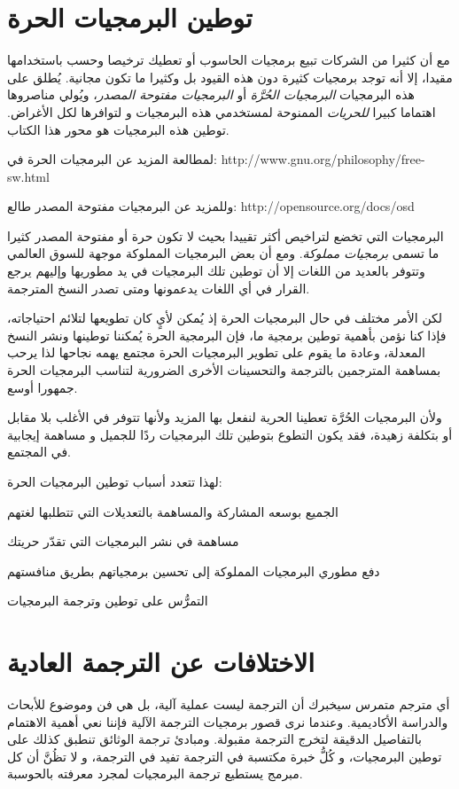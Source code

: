\section{توطين البرمجيات الحرة}
مع أن كثيرا من الشركات تبيع برمجيات الحاسوب أو تعطيك ترخيصا وحسب
باستخدامها مقيدا، إلا أنه توجد برمجيات كثيرة دون هذه القيود بل وكثيرا
ما تكون مجانية. يُطلق على هذه البرمجيات {\it البرمجيات الحُرَّة} أو
{\it البرمجيات مفتوحة المصدر}، ويُولي مناصروها اهتماما كبيرا {\it
للحريات} الممنوحة لمستخدمي هذه البرمجيات و لتوافرها لكل الأغراض. توطين
هذه البرمجيات هو محور هذا الكتاب.

لمطالعة المزيد عن البرمجيات الحرة في:
http://www.gnu.org/philosophy/free-sw.html

وللمزيد عن البرمجيات مفتوحة المصدر طالع: http://opensource.org/docs/osd

البرمجيات التي تخضع لتراخيص أكثر تقييدا بحيث لا تكون حرة أو مفتوحة
المصدر كثيرا ما تسمى {\it برمجيات مملوكة}. ومع أن بعض البرمجيات
المملوكة موجهة للسوق العالمي وتتوفر بالعديد من اللغات إلا أن توطين تلك
البرمجيات في يد مطوريها وإليهم يرجع القرار في أي اللغات يدعمونها ومتى
تصدر النسخ المترجمة.

لكن الأمر مختلف في حال البرمجيات الحرة إذ يُمكن لأيٍ كان تطويعها لتلائم
احتياجاته، فإذا كنا نؤمن بأهمية توطين برمجية ما، فإن البرمجية الحرة
يُمكننا توطينها ونشر النسخ المعدلة، وعادة ما يقوم على تطوير البرمجيات
الحرة مجتمع يهمه نجاحها لذا يرحب بمساهمة المترجمين بالترجمة والتحسينات
الأخرى الضرورية لتناسب البرمجيات الحرة جمهورا أوسع. 

ولأن البرمجيات الحُرَّة تعطينا الحرية لنفعل بها المزيد ولأنها تتوفر في
الأغلب بلا مقابل أو بتكلفة زهيدة، فقد يكون التطوع بتوطين تلك البرمجيات
ردًا للجميل و مساهمة إيجابية في المجتمع.

لهذا تتعدد أسباب توطين البرمجيات الحرة:

\startitemize[1]
\item الجميع بوسعه المشاركة والمساهمة بالتعديلات التي تتطلبها لغتهم
\item مساهمة في نشر البرمجيات التي تقدّر حريتك
\item دفع مطوري البرمجيات المملوكة إلى تحسين برمجياتهم بطريق منافستهم
\item التمرُّس على توطين وترجمة البرمجيات
\stopitemize
\section{الاختلافات عن الترجمة العادية}
أي مترجم متمرس سيخبرك أن الترجمة ليست عملية آلية، بل هي فن وموضوع
للأبحاث والدراسة الأكاديمية. وعندما نرى قصور برمجيات الترجمة الآلية
فإننا نعي أهمية الاهتمام بالتفاصيل الدقيقة لتخرج الترجمة مقبولة. ومبادئ
ترجمة الوثائق تنطبق كذلك على توطين البرمجيات، و كُلُّ خبرة مكتسبة في
الترجمة تفيد في الترجمة، و لا تظُنَّ أن كل مبرمج يستطيع ترجمة البرمجيات
لمجرد معرفته بالحوسبة.

